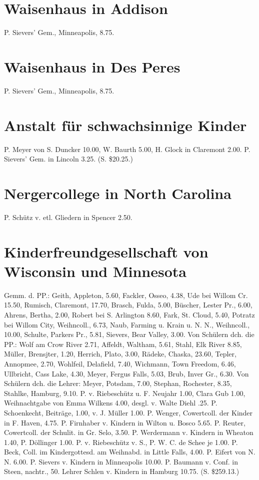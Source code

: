 \section{Waisenhaus in Addison}

P. Sievers’ Gem., Minneapolis, 8.75.

\section{Waisenhaus in Des Peres}

P. Sievers’ Gem., Minneapolis, 8.75.

\section{Anstalt für schwachsinnige Kinder}

P. Meyer von S. Duncker 10.00, W. Baurth 5.00, H. Glock in Claremont 2.00. P. Sievers’ Gem. in Lincoln 3.25. (S. \$20.25.)

\section{Nergercollege in North Carolina}

P. Schütz v. etl. Gliedern in Spencer 2.50.

\section{Kinderfreundgesellschaft von Wisconsin und Minnesota}

Gemm. d. PP.: Geith, Appleton, 5.60, Fackler, Osseo, 4.38, Ude bei Willom Cr. 15.50, Rumisch, Claremont, 17.70, Brasch, Fulda, 5.00, Büscher, Lester Pr., 6.00, Ahrens, Bertha, 2.00, Robert bei S. Arlington 8.60, Fark, St. Cloud, 5.40, Potratz bei Willom City, Weihncoll., 6.73, Naub, Farming u. Krain u. N. N., Weihncoll., 10.00, Schulte, Parkers Pr., 5.81, Sievers, Bear Valley, 3.00. Von Schülern dch. die PP.: Wolf am Crow River 2.71, Affeldt, Waltham, 5.61, Stahl, Elk River 8.85, Müller, Brensjter, 1.20, Herrich, Plato, 3.00, Rädeke, Chaska, 23.60, Tepler, Annopmee, 2.70, Wohlfeil, Delafield, 7.40, Wichmann, Town Freedom, 6.46, Ullbricht, Cass Lake, 4.30, Meyer, Fergus Falls, 5.03, Brub, Inver Gr., 6.30. Von Schülern dch. die Lehrer: Meyer, Potsdam, 7.00, Stephan, Rochester, 8.35, Stahlke, Hamburg, 9.10. P. v. Riebeschütz u. F. Neujahr 1.00, Clara Gub 1.00, Weihnachtgabe von Emma Wilkens 4.00, desgl. v. Walte Diehl .25. P. Schoenkecht, Beiträge, 1.00, v. J. Müller 1.00. P. Wenger, Cowertcoll. der Kinder in F. Haven, 4.75. P. Firnhaber v. Kindern in Wilton u. Bosco 5.65. P. Reuter, Cowertcoll. der Schulit. in Gr. Selo, 3.50. P. Werdermann v. Kindern in Wheaton 1.40, P. Döllinger 1.00. P. v. Riebeschütz v. S., P. W. C. de Schee je 1.00. P. Beck, Coll. im Kindergottesd. am Weihnabd. in Little Falls, 4.00. P. Eifert von N. N. 6.00. P. Sievers v. Kindern in Minneapolis 10.00. P. Baumann v. Conf. in Steen, nachtr., 50. Lehrer Schlen v. Kindern in Hamburg 10.75. (S. \$259.13.)

